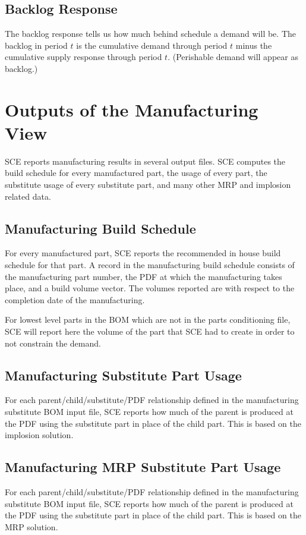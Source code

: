 \subsection{Backlog Response}
The backlog response tells us how much behind schedule a demand will
be.  The backlog in period $t$ is the cumulative demand through period
$t$ minus the cumulative supply response through period $t$.
(Perishable demand will appear as backlog.)

\section{Outputs of the Manufacturing View}
SCE reports manufacturing results in several output files.  SCE
computes the build schedule for every manufactured part, the usage of
every part, the substitute usage of every substitute part, and many
other MRP and implosion related data.

\subsection{Manufacturing Build Schedule}
For every manufactured part, SCE reports the recommended in house build
schedule for that part.  A record in the manufacturing build schedule
consists of the manufacturing part number, the PDF at which the
manufacturing takes place, and a build volume vector.  The volumes
reported are with respect to the completion date of the manufacturing.

For lowest level parts in the BOM which are not in the parts
conditioning file, SCE will report here the volume of the part that
SCE had to create in order to not constrain the demand.


\subsection{Manufacturing Substitute Part Usage}
For each parent/child/substitute/PDF relationship defined in the
manufacturing substitute BOM input file, SCE reports how much of the
parent is produced at the PDF using the substitute part in place of
the child part. This is based on the implosion solution.

\subsection{Manufacturing MRP Substitute Part Usage}
For each parent/child/substitute/PDF relationship defined in the
manufacturing substitute BOM input file, SCE reports how much of the
parent is produced at the PDF using the substitute part in place of
the child part.  This is based on the MRP solution.

